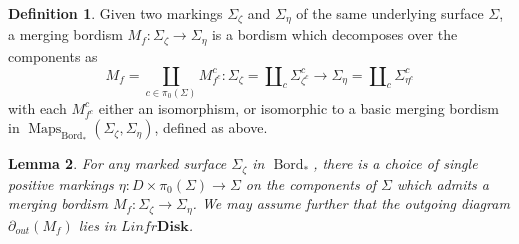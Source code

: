 \documentclass[reqno]{amsart}
\newtheorem{lemma}{Lemma}[section]
\theoremstyle{definition}
\newtheorem{definition}[lemma]{Definition}
\newcommand{\Disk}{\mathbf{Disk}}
\DeclareMathOperator{\Maps}{Maps}
\DeclareMathOperator{\Bord}{Bord}
\renewcommand{\1}{\mathbf{1}}
\begin{document}
\begin{definition}
Given two markings $\Sigma_{\zeta}$ and $\Sigma_{\eta}$ of the same underlying surface $\Sigma$, a merging bordism $M_f:\Sigma_{\zeta}\to \Sigma_{\eta}$ is a bordism which decomposes over the components as
\[
M_f=\coprod_{c\in \pi_0(\Sigma)}M_{f^c}^c:\Sigma_{\zeta}=\amalg_c\Sigma^c_{\zeta^c}\to \Sigma_{\eta}=\amalg_c\Sigma^c_{\eta^c}
\]
with each $M^c_{f^c}$ either an isomorphism, or isomorphic to a basic merging bordism in $\Maps_{\Bord_{\ast}}(\Sigma_{\zeta},\Sigma_{\eta})$, defined as above.
\end{definition}

\begin{lemma}
For any marked surface $\Sigma_{\zeta}$ in $\Bord_{\ast}$, there is a choice of single positive markings $\eta:D\times \pi_0(\Sigma)\to \Sigma$ on the components of $\Sigma$ which admits a merging bordism $M_f:\Sigma_{\zeta}\to \Sigma_{\eta}$.  We may assume further that the outgoing diagram $\partial_{out}(M_f)$ lies in $Linfr\Disk$.
\end{lemma}
\end{document}

